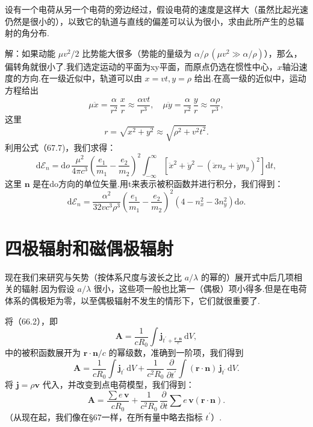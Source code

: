 \begin{xiti}
\quad 设有一个电荷从另一个电荷的旁边经过，假设电荷的速度是这样大（虽然比起光速仍然是很小的），以致它的轨道与直线的偏差可以认为很小，求由此所产生的总辐射的角分布.

解：如果动能 $\mu v^2/2$ 比势能大很多（势能的量级为 $\alpha/\rho\,(\mu v^2\gg\alpha/\rho)$），那么，偏转角就很小了.我们选定运动的平面为xy平面，而原点仍选在惯性中心，$x$轴沿速度的方向.在一级近似中，轨道可以由 $x=vt, y=\rho$ 给出.在高一级的近似中，运动方程给出
\begin{equation*}
  \mu\ddot{x}=\frac{\alpha}{r^2}\,\frac{x}{r}\approx\frac{\alpha vt}{r^3},\quad
  \mu\ddot{y}=\frac{\alpha}{r^2}\,\frac{y}{r}\approx\frac{\alpha\rho}{r^3},
\end{equation*}
这里
\begin{equation*}
  r=\sqrt{x^2+y^2}\approx\sqrt{\rho^2+v^2t^2}.
\end{equation*}
利用公式（67.7)，我们求得：
\begin{equation*}
  \mathrm{d}\mathcal{E}_n=\mathrm{d}o\,\frac{\mu^2}{4\pi c^3}\left(\frac{e_1}{m_1}-\frac{e_2}{m_2}\right)^2
  \int_{-\infty}^{\infty}\left[\ddot{x}^2+\ddot{y}^2-(\ddot{x}n_x+\ddot{y}n_y)^2\right]\mathrm{d}t,
\end{equation*}
这里 $\boldsymbol{n}$ 是在do方向的单位矢量.用t来表示被积函数并进行积分，我们得到：
\begin{equation*}
  \mathrm{d}\mathcal{E}_n=\frac{\alpha^2}{32vc^3\rho^3}\left(\frac{e_1}{m_1}-\frac{e_2}{m_2}\right)^2
  \left(4-n_x^2-3n_y^2\right)\mathrm{d}o.
\end{equation*}

\end{xiti}

\section{四极辐射和磁偶极辐射}

现在我们来研究与矢势（按体系尺度与波长之比 $a/\lambda$ 的幂的）展开式中后几项相关的辐射.因为假设 $a/\lambda$ 很小，这些项一般也比第一（偶极）项小得多.但是在电荷体系的偶极矩为零，以至偶极辐射不发生的情形下，它们就很重要了.

将（66.2），即
\begin{equation*}
  \boldsymbol{A}=\frac{1}{cR_0}\int\boldsymbol{j}_{t^{\prime}+\frac{\boldsymbol{r}\cdot\boldsymbol{n}}{c}}\,\mathrm{d}V,
\end{equation*}
中的被积函数展开为 $\boldsymbol{r}\cdot\boldsymbol{n}/c$ 的幂级数，准确到一阶项，我们得到
\begin{equation*}
  \boldsymbol{A}=\frac{1}{cR_0}\int\boldsymbol{j}_{t^{\prime}}\,\mathrm{d}V
  +\frac{1}{c^2R_0}\,\frac{\partial}{\partial t^{\prime}}\int(\boldsymbol{r}\cdot\boldsymbol{n})\,\boldsymbol{j}_{t^{\prime}}\,\mathrm{d}V.
\end{equation*}
将 $\boldsymbol{j}=\rho\boldsymbol{v}$ 代入，并改变到点电荷模型，我们得到：
\begin{equation}
  \boldsymbol{A}=\frac{\sum e\,\boldsymbol{v}}{cR_0}
  +\frac{1}{c^2R_0}\,\frac{\partial}{\partial t}\sum e\,\boldsymbol{v}(\boldsymbol{r}\cdot\boldsymbol{n}).
\end{equation}
（从现在起，我们像在§67一样，在所有量中略去指标 $t^{\prime}$）.

